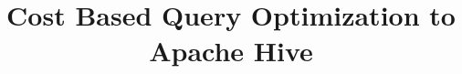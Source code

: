 \documentclass{vldb}
\begin{document}


\title{Cost Based Query Optimization to Apache Hive}



%
%
%
%

\end{document}
